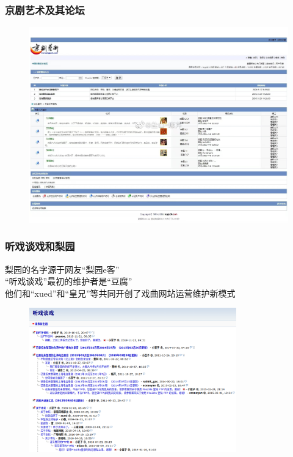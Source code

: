 \documentclass[cjk,slidestop,compress,mathserif,blue]{beamer}
\begin{document}
\frame
{
	\frametitle{京剧艺术及其论坛}
\begin{figure}[h!]
\centering
\vspace{-0.3in}
\includegraphics[height=0.75\textwidth,width=1.05\textwidth,clip]{Figures/PekOpe_Jingyilun.jpg}
\label{Jingyi-2}
\end{figure}
}

\frame
{
	\frametitle{听戏谈戏和梨园}
	梨园的名字源于网友“梨园\textrm{e}客”\\“听戏谈戏”最初的维护者是“豆腐”\\
	他们和“\textrm{xued}”和“皇兄”等共同开创了戏曲网站运营维护新模式
\begin{figure}[h!]
\centering
\includegraphics[height=0.55\textwidth,width=0.80\textwidth,clip]{Figures/PekOpe_Talk.png}
\label{Talk}
\end{figure}
}
\end{document}
